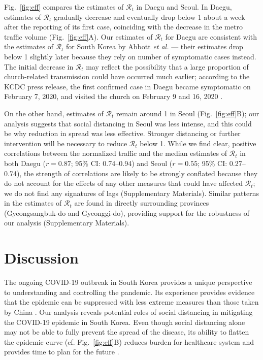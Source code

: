\documentclass[12pt]{article}
\newcommand{\fref}[1]{Fig.~\ref{fig:#1}}
\begin{document}
\fref{eff} compares the estimates of $\mathcal R_t$ in Daegu and Seoul.
In Daegu, estimates of $\mathcal R_t$ gradually decrease and eventually drop below 1 about a week after the reporting of its first case, coinciding with the decrease in the metro traffic volume (\fref{eff}A).
Our estimates of $\mathcal R_t$ for Daegu are consistent with the estimates of $\mathcal R_t$ for South Korea by Abbott \textit{et al.} \cite{tempvar} --- their estimates drop below 1 slightly later because they rely on number of symptomatic cases instead.
The initial decrease in $\mathcal R_t$ may reflect the possibility that a large proportion of church-related transmission could have occurred much earlier; according to the KCDC press release, the first confirmed case in Daegu became symptomatic on February 7, 2020, and visited the church on February 9 and 16, 2020 \citep{kcdc}.

On the other hand, estimates of $\mathcal R_t$ remain around 1 in Seoul (\fref{eff}B);
our analysis suggests that social distancing in Seoul was less intense, and this could be why reduction in spread was less effective.
Stronger distancing or further intervention will be necessary to reduce $\mathcal R_t$ below 1.
While we find clear, positive correlations between the normalized traffic and the median estimates of $\mathcal R_t$ in both Daegu ($r=0.87$; 95\% CI: 0.74--0.94) and Seoul ($r=0.55$; 95\% CI: 0.27--0.74), the strength of correlations are likely to be strongly conflated because they do not account for the effects of any other measures that could have affected $\mathcal R_t$;
we do not find any signatures of lags (Supplementary Materials).
Similar patterns in the estimates of $\mathcal R_t$ are found in directly surrounding provinces (Gyeongsangbuk-do and Gyeonggi-do), providing support for the robustness of our analysis (Supplementary Materials).

\section{Discussion}

The ongoing COVID-19 outbreak in South Korea provides a unique perspective to understanding and controlling the pandemic.
Its experience provides evidence that the epidemic can be suppressed with less extreme measures than those taken by China \citep{kickbusch2020response}.
Our analysis reveals potential roles of social distancing in mitigating the COVID-19 epidemic in South Korea.
Even though social distancing alone may not be able to fully prevent the spread of the disease, its ability to flatten the epidemic curve (cf. \fref{eff}B) reduces burden for healthcare system and provides time to plan for the future \citep{anderson2020will}.
\end{document}

